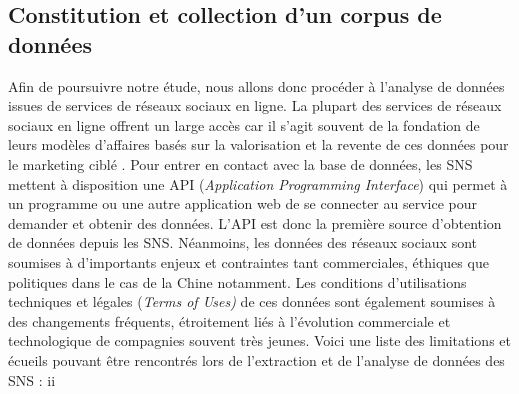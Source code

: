 \subsection[Constitution et collection d{\textquoteright}un corpus de donn\'ees]{Constitution et collection d{\textquoteright}un corpus de donn\'ees}
Afin de poursuivre notre \'etude, nous allons donc proc\'eder \`a
l{\textquoteright}analyse de donn\'ees issues de services de r\'eseaux
sociaux en ligne. La plupart des services de r\'eseaux sociaux en ligne
offrent un large acc\`es car il s{\textquoteright}agit souvent de la
fondation de leurs mod\`eles d{\textquoteright}affaires bas\'es sur la
valorisation et la revente de ces donn\'ees pour le marketing cibl\'e
\citep{Ko2010}. Pour entrer en contact avec la base de donn\'ees, les SNS
mettent \`a disposition une API (\textit{Application Programming
Interface}) qui permet \`a un programme ou une autre application web de
se connecter au service pour demander et obtenir des donn\'ees.
L{\textquoteright}API est donc la premi\`ere source
d{\textquoteright}obtention de donn\'ees depuis les SNS. N\'eanmoins,
les donn\'ees des r\'eseaux sociaux sont soumises \`a
d{\textquoteright}importants enjeux et contraintes tant commerciales,
\'ethiques que politiques dans le cas de la Chine notamment. Les
conditions d{\textquoteright}utilisations techniques et l\'egales
(\textit{Terms of Uses) }de ces donn\'ees sont \'egalement soumises \`a
des changements fr\'equents, \'etroitement li\'es \`a
l{\textquoteright}\'evolution commerciale et technologique de
compagnies souvent tr\`es jeunes. Voici une liste des limitations et
\'ecueils pouvant \^etre rencontr\'es lors de
l{\textquoteright}extraction et de l{\textquoteright}analyse de
donn\'ees des SNS :
ii
